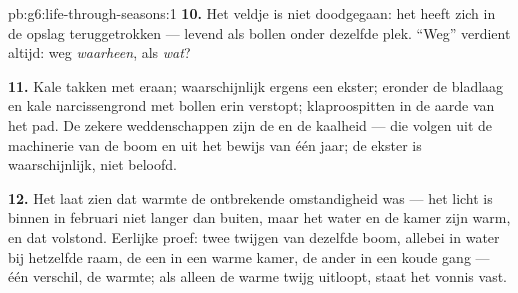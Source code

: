 \begin{solution}{pb:g6:life-through-seasons:1}
\textbf{10.} Het veldje is niet doodgegaan: het heeft zich in de opslag
teruggetrokken --- levend als bollen onder dezelfde plek. ``Weg'' verdient
altijd: weg \emph{waarheen}, als \emph{wat}?

\textbf{11.} Kale takken met  eraan; waarschijnlijk ergens een
ekster; eronder de bladlaag en kale narcissengrond met bollen erin
verstopt; klaproospitten in de aarde van het pad. De zekere weddenschappen
zijn de  en de kaalheid --- die volgen uit de 
machinerie van de boom en uit het bewijs van één jaar; de ekster is
waarschijnlijk, niet beloofd.

\textbf{12.} Het laat zien dat warmte de ontbrekende omstandigheid was
--- het licht is binnen in februari niet langer dan buiten, maar het
water en de kamer zijn warm, en dat volstond. Eerlijke proef: twee
twijgen van dezelfde boom, allebei in water bij hetzelfde raam, de een
in een warme kamer, de ander in een koude gang --- één verschil, de
warmte; als alleen de warme twijg uitloopt, staat het vonnis vast.
\end{solution}
